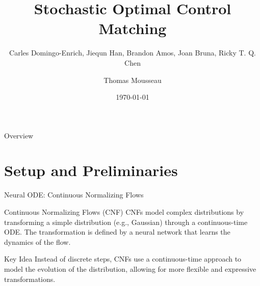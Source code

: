 \documentclass[aspectratio=169,xcolor=dvipsnames]{beamer}
\title{Stochastic Optimal Control Matching}
\subtitle{Carles Domingo-Enrich, Jiequn Han, Brandon Amos, Joan Bruna, Ricky T. Q. Chen}
\author{Thomas Mousseau}
\date{\today} %
\begin{document}
\begin{frame}
    \titlepage
\end{frame}

\begin{frame}{Overview}
    \tableofcontents
\end{frame}

\section{Setup and Preliminaries}

\begin{frame}{Neural ODE: Continuous Normalizing Flows}

    \begin{block}{Continuous Normalizing Flows (CNF)}
        CNFs model complex distributions by transforming a simple distribution (e.g., Gaussian) through a continuous-time ODE. The transformation is defined by a neural network that learns the dynamics of the flow.
    \end{block}
    
    \vspace{0.3cm}
    
    \begin{alertblock}{Key Idea}
        Instead of discrete steps, CNFs use a continuous-time approach to model the evolution of the distribution, allowing for more flexible and expressive transformations.
    \end{alertblock}

\end{frame}
\end{document}
